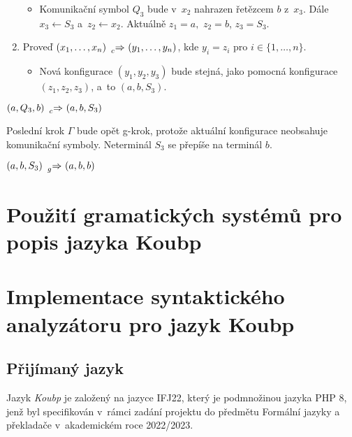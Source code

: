 \begin{example}
\begin{enumerate}
        \begin{itemize}[label=$\circ$]
            \item Komunikační symbol $Q_3$ bude v~$x_2$ nahrazen řetězcem $b$ z~$x_3$. Dále $x_3 \gets S_3$ a~$z_2 \gets x_2$.
            Aktuálně $z_1 = a,$ $z_2 = b$, $z_3 = S_3$. 
        \end{itemize}
        \item Proveď $(x_1, \ldots, x_n) \ \prescript{}{c}{\Rightarrow} \ (y_1, \ldots, y_n)$, kde $y_i = z_i$ pro $i \in \{1, \ldots, n\}$.
        \begin{itemize}[label=$\circ$]
            \item Nová konfigurace $(y_1, y_2, y_3)$ bude stejná, jako pomocná konfigurace $(z_1, z_2, z_3)$, a~to $(a, b, S_3)$.
        \end{itemize}
    \end{enumerate}
    \begin{center}
        $(a, Q_3, b) \ \prescript{}{c}{\Rightarrow} \ (a, b, S_3)$
    \end{center}
    Poslední krok $\Gamma$ bude opět g-krok, protože aktuální konfigurace neobsahuje komunikační symboly.
    Neterminál $S_3$ se přepíše na terminál $b$.
    \begin{center}
        $(a, b, S_3) \ \prescript{}{g}{\Rightarrow} \ (a, b, b)$
    \end{center}
\end{example}

\chapter{Použití gramatických systémů pro popis jazyka Koubp}

\chapter{Implementace syntaktického analyzátoru pro jazyk Koubp }\label{7_implementace}


\section{Přijímaný jazyk}

Jazyk \emph{Koubp} je založený na jazyce IFJ22, který je podmnožinou jazyka PHP 8, jenž byl specifikován v~rámci zadání projektu do předmětu Formální jazyky a překladače v~akademickém roce 2022/2023.

